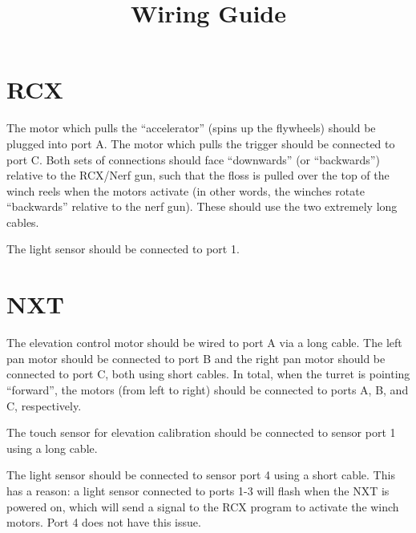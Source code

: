 \documentclass{article}
\title{Wiring Guide}
\author{}
\date{}
\begin{document}
	\maketitle

	\section{RCX}
	The motor which pulls the ``accelerator'' (spins up the flywheels) should be plugged into port A.
	The motor which pulls the trigger should be connected to port C.
	Both sets of connections should face ``downwards'' (or ``backwards'') relative to the RCX/Nerf gun, such that the floss is pulled over the top of the winch reels
	when the motors activate (in other words, the winches rotate ``backwards'' relative to the nerf gun).
	These should use the two extremely long cables.

	The light sensor should be connected to port 1.

	\section{NXT}
	The elevation control motor should be wired to port A via a long cable.
	The left pan motor should be connected to port B and the right pan motor should be connected to port C, both using short cables.
	In total, when the turret is pointing ``forward'', the motors (from left to right) should be connected to ports A, B, and C, respectively.

	The touch sensor for elevation calibration should be connected to sensor port 1 using a long cable.

	The light sensor should be connected to sensor port 4 using a short cable.
	This has a reason: a light sensor connected to ports 1-3 will flash when the NXT is powered on, which will send a signal to the RCX program to activate the winch motors.
	Port 4 does not have this issue.
\end{document}
